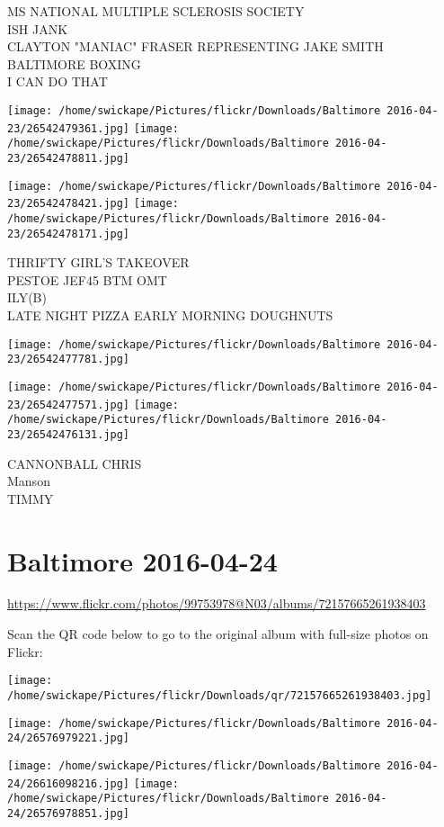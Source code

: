 \documentclass[10pt,letterpaper]{article}
\begin{document}
MS NATIONAL MULTIPLE SCLEROSIS SOCIETY\\
ISH JANK\\
CLAYTON "MANIAC" FRASER REPRESENTING JAKE SMITH BALTIMORE BOXING\\
I CAN DO THAT
\pagebreak

\texttt{[image: /home/swickape/Pictures/flickr/Downloads/Baltimore 2016-04-23/26542479361.jpg]}
\texttt{[image: /home/swickape/Pictures/flickr/Downloads/Baltimore 2016-04-23/26542478811.jpg]}

\texttt{[image: /home/swickape/Pictures/flickr/Downloads/Baltimore 2016-04-23/26542478421.jpg]}
\texttt{[image: /home/swickape/Pictures/flickr/Downloads/Baltimore 2016-04-23/26542478171.jpg]}

THRIFTY GIRL'S TAKEOVER\\
PESTOE JEF45 BTM OMT\\
ILY(B)\\
LATE NIGHT PIZZA EARLY MORNING DOUGHNUTS
\pagebreak

\texttt{[image: /home/swickape/Pictures/flickr/Downloads/Baltimore 2016-04-23/26542477781.jpg]}

\vspace{0.25in}
\texttt{[image: /home/swickape/Pictures/flickr/Downloads/Baltimore 2016-04-23/26542477571.jpg]}
\texttt{[image: /home/swickape/Pictures/flickr/Downloads/Baltimore 2016-04-23/26542476131.jpg]}

CANNONBALL CHRIS\\
Manson\\
TIMMY
\pagebreak

\section*{Baltimore 2016-04-24}

\url{https://www.flickr.com/photos/99753978@N03/albums/72157665261938403}

Scan the QR code below to go to the original album with full-size photos on Flickr:

\texttt{[image: /home/swickape/Pictures/flickr/Downloads/qr/72157665261938403.jpg]}
\pagebreak

\texttt{[image: /home/swickape/Pictures/flickr/Downloads/Baltimore 2016-04-24/26576979221.jpg]}

\vspace{0.25in}
\texttt{[image: /home/swickape/Pictures/flickr/Downloads/Baltimore 2016-04-24/26616098216.jpg]}
\texttt{[image: /home/swickape/Pictures/flickr/Downloads/Baltimore 2016-04-24/26576978851.jpg]}
\end{document}
